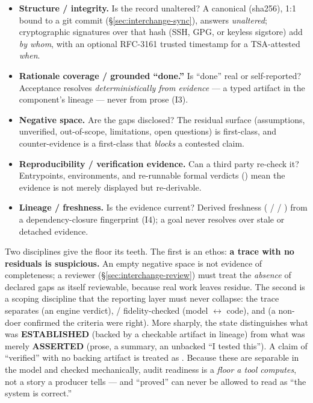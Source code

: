 \begin{itemize}
\item \textbf{Structure / integrity.} Is the record unaltered? A canonical  (sha256), 1:1
bound to a git commit (\S\ref{sec:interchange-sync}), answers \emph{unaltered}; cryptographic signatures over
that hash (SSH, GPG, or keyless sigstore) add \emph{by whom}, with an optional RFC-3161 trusted timestamp for
a TSA-attested \emph{when}.
\item \textbf{Rationale coverage / grounded ``done.''} Is ``done'' real or self-reported? Acceptance resolves
\emph{deterministically from evidence} --- a typed artifact in the component's lineage --- never from prose
(I3).
\item \textbf{Negative space.} Are the gaps disclosed? The residual surface (assumptions, unverified,
out-of-scope, limitations, open questions) is first-class, and counter-evidence is a first-class
 that \emph{blocks} a contested claim.
\item \textbf{Reproducibility / verification evidence.} Can a third party re-check it? Entrypoints,
environments, and re-runnable formal verdicts () mean the evidence is not merely
displayed but re-derivable.
\item \textbf{Lineage / freshness.} Is the evidence current? Derived freshness ( /  /
) from a dependency-closure fingerprint (I4); a goal never resolves  over stale or
detached evidence.
\end{itemize}

Two disciplines give the floor its teeth. The first is an ethos: \textbf{a trace with no residuals is
suspicious.} An empty negative space is not evidence of completeness; a reviewer (\S\ref{sec:interchange-review})
must treat the \emph{absence} of declared gaps as itself reviewable, because real work leaves residue. The
second is a scoping discipline that the reporting layer must never collapse: the trace separates
 (an engine verdict),  / fidelity-checked (model $\leftrightarrow$ code), and
 (a non-doer confirmed the criteria were right). More sharply, the state distinguishes what
was \textbf{ESTABLISHED} (backed by a checkable artifact in lineage) from what was merely \textbf{ASSERTED}
(prose, a summary, an unbacked ``I tested this''). A claim of ``verified'' with no backing artifact is treated
as . Because these are separable in the model and checked mechanically, audit readiness is a
\emph{floor a tool computes}, not a story a producer tells --- and ``proved'' can never be allowed to read as
``the system is correct.''

